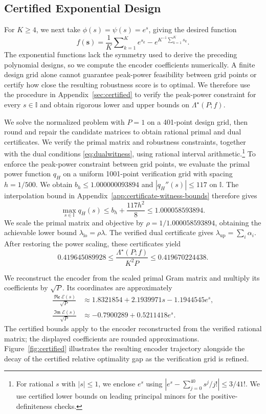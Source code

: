 \documentclass[journal,12pt,onecolumn,draftclsnofoot]{IEEEtran}
\newcommand{\enc}{\mathscr{E}}\newcommand{\dec}{\mathscr{D}}\newcommand{\R}{\mathbb R}\newcommand{\C}{\mathbb C}
\renewcommand{\Re}{\mathop{\mathfrak{Re}}\nolimits}
\renewcommand{\Im}{\mathop{\mathfrak{Im}}\nolimits}
\begin{document}
\subsection{Certified Exponential Design}

For $K\ge4$, we next take $\phi(s)=\psi(s)=e^s$, giving the desired function
$$
 f(\boldsymbol s)
 =\frac1K\sum\nolimits_{k=1}^K e^{s_k}
  -e^{K^{-1}\sum_{k=1}^K s_k}.
$$
The exponential functions lack the symmetry used to derive the preceding polynomial designs, so we compute the encoder coefficients numerically. A finite design grid alone cannot guarantee peak-power feasibility between grid points or certify how close the resulting robustness score is to optimal. We therefore use the procedure in Appendix~\ref{sec:certified} to verify the peak-power constraint for every $s\in\mathbb I$ and obtain rigorous lower and upper bounds on $\Lambda^\star(P;f)$. 



We solve the normalized problem with $P=1$ on a 401-point
design grid, then round and repair the candidate matrices
to obtain rational primal and dual certificates. We verify
the primal matrix and robustness constraints, together with
the dual conditions \eqref{eq:dualwitness}, using rational
interval arithmetic.\footnote{For rational $s$ with $|s|\le1$, we
enclose $e^s$ using
$|e^s-\sum_{j=0}^{40}s^j/j!|\le3/41!$.
We use certified lower bounds on leading principal minors
for the positive-definiteness checks.} To enforce the peak-power constraint between grid points,
we evaluate the primal power function $q_H$ on a uniform
1001-point verification grid with spacing $h=1/500$.
We obtain $b_h\le1.000000093894$ and
$|q_H''(s)|\le117$ on $\mathbb I$.
The interpolation bound in
Appendix~\ref{app:certificate-witness-bounds} therefore gives
$$
\max_{s\in\mathbb I}q_H(s)
\le b_h+\frac{117h^2}{8}
\le1.000058593894.
$$
We scale the primal matrix and objective by
$\rho=1/1.000058593894$, obtaining the achievable lower bound
$\lambda_{\mathrm{lo}}=\rho\lambda$.
The verified dual certificate gives
$\lambda_{\mathrm{up}}=\sum_i\alpha_i$.
After restoring the power scaling, these certificates yield
\begin{equation}
0.419645089928
\le \frac{\Lambda^\star(P;f)}{K^2P}
\le 0.419670224438.
\label{eq:expcertificate}
\end{equation}

We reconstruct the encoder from the scaled primal Gram
matrix and multiply its coefficients by $\sqrt P$.
Its coordinates are approximately
\begin{align*}
\frac{\Re\enc(s)}{\sqrt P}
&\approx1.8321854+2.1939971s-1.1944545e^s,\\
\frac{\Im\enc(s)}{\sqrt P}
&\approx-0.7900289+0.5211418e^s.
\end{align*}
The certified bounds apply to the encoder reconstructed from the verified rational matrix; the displayed coefficients are rounded approximations. Figure~\ref{fig:certified} illustrates the resulting encoder trajectory alongside the decay of the certified relative optimality gap as the verification grid is refined.
\end{document}
